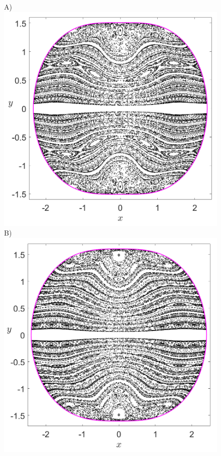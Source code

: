 \documentclass[10pt,aps,onecolumn,superscriptaddress]{revtex4-2}
\begin{document}
\begin{figure}[htbp]
	A)\includegraphics[scale=0.3]{PS_py_0_H_-0_2_w0_1div2_k_sqrt7_min_5delta_d_1.png}
	B)\includegraphics[scale=0.3]{PS_py_0_H_-0_2_w0_1div2_k_sqrt7_min_4delta_d_1.png}	

\end{figure}
\end{document}
